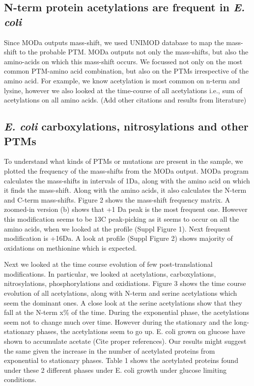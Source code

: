 \documentclass[12pt]{article}
\begin{document}
\subsection{N-term protein acetylations are frequent in \emph{E. coli}}
Since MODa outputs mass-shift, we used UNIMOD database to map the mass-shift to the probable PTM. MODa outputs not only the mass-shifts, but also the amino-acids on which this mass-shift occurs. We focussed not only on the most common PTM-amino acid combination, but also on the PTMs irrespective of the amino acid. For example, we know acetylation is most common on n-term and lysine, however we also looked at the time-course of all acetylations i.e., sum of acetylations on all amino acids. (Add other citations and results from literature)

\subsection{\emph{E. coli} carboxylations, nitrosylations and other PTMs}
To understand what kinds of PTMs or mutations are present in the sample, we plotted the frequency of the mass-shifts from the MODa output. MODa program calculates the mass-shifts in intervals of 1Da, along with the amino acid on which it finds the mass-shift. Along with the amino acids, it also calculates the N-term and C-term mass-shifts. Figure 2 shows the mass-shift frequency matrix. A zoomed-in version (b) shows that +1 Da peak is the most frequent one. However this modification seems to be 13C peak-picking as it seems to occur on all the amino acids, when we looked at the profile (Suppl Figure 1). Next frequent modification is +16Da. A look at profile (Suppl Figure 2) shows majority of oxidations on methionine which is expected.

Next we looked at the time course evolution of few post-translational modifications. In particular, we looked at acetylations, carboxylations, nitrosylations, phosphorylations and oxidiations. Figure 3 shows the time course evolution of all acetylations, along with N-term and serine acetylations which seem the dominant ones. A close look at the serine acetylations show that they fall at the N-term x\% of the time. During the exponential phase, the acetylations seem not to change much over time. However during the stationary and the long-stationary phases, the acetylations seem to go up. E. coli grown on glucose have shown to accumulate acetate (Cite proper references). Our results might suggest the same given the increase in the number of acetylated proteins from exponential to stationary phases. Table 1 shows the acetylated proteins found under these 2 different phases under E. coli growth under glucose limiting conditions.
\end{document}

